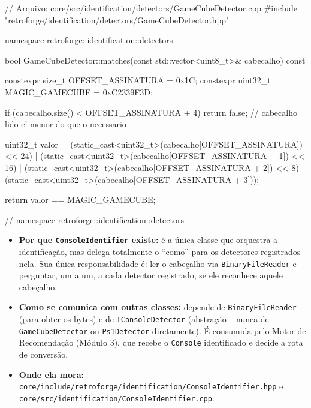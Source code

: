 \begin{CaixaCodigo}
// Arquivo: core/src/identification/detectors/GameCubeDetector.cpp
#include "retroforge/identification/detectors/GameCubeDetector.hpp"

namespace retroforge::identification::detectors {

bool GameCubeDetector::matches(const std::vector<uint8_t>& cabecalho) const {
    constexpr size_t OFFSET_ASSINATURA = 0x1C;
    constexpr uint32_t MAGIC_GAMECUBE = 0xC2339F3D;

    if (cabecalho.size() < OFFSET_ASSINATURA + 4) {
        return false; // cabecalho lido e' menor do que o necessario
    }

    uint32_t valor =
        (static_cast<uint32_t>(cabecalho[OFFSET_ASSINATURA])     << 24) |
        (static_cast<uint32_t>(cabecalho[OFFSET_ASSINATURA + 1]) << 16) |
        (static_cast<uint32_t>(cabecalho[OFFSET_ASSINATURA + 2]) << 8)  |
        (static_cast<uint32_t>(cabecalho[OFFSET_ASSINATURA + 3]));

    return valor == MAGIC_GAMECUBE;
}

} // namespace retroforge::identification::detectors
\end{CaixaCodigo}

\begin{itemize}
    \item \textbf{Por que \texttt{ConsoleIdentifier} existe:} é a única classe que orquestra a identificação, mas delega totalmente o ``como'' para os detectores registrados nela. Sua única responsabilidade é: ler o cabeçalho via \texttt{BinaryFileReader} e perguntar, um a um, a cada detector registrado, se ele reconhece aquele cabeçalho.
    \item \textbf{Como se comunica com outras classes:} depende de \texttt{BinaryFileReader} (para obter os bytes) e de \texttt{IConsoleDetector} (abstração -- nunca de \texttt{GameCubeDetector} ou \texttt{Ps1Detector} diretamente). É consumida pelo Motor de Recomendação (Módulo 3), que recebe o \texttt{Console} identificado e decide a rota de conversão.
    \item \textbf{Onde ela mora:} \texttt{core/include/retroforge/identification/ConsoleIdentifier.hpp} e \texttt{core/src/identification/ConsoleIdentifier.cpp}.
\end{itemize}

